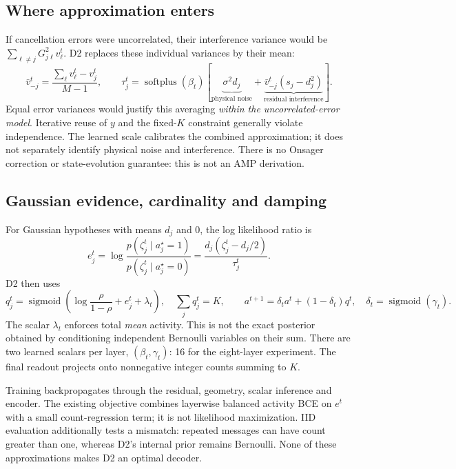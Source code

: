 \documentclass[10pt,a4paper]{article}
\newcommand{\sigm}{\operatorname{sigmoid}}
\newcommand{\softplus}{\operatorname{softplus}}
\begin{document}
\subsection{Where approximation enters}
If cancellation errors were uncorrelated, their interference variance would be
$\sum_{\ell\ne j}G_{j\ell}^2 v_\ell^t$. D2 replaces these individual variances by their mean:
\begin{equation}
 \bar v_{-j}^t=\frac{\sum_\ell v_\ell^t-v_j^t}{M-1},\qquad
 \tau_j^t=\softplus(\beta_t)
 \left[\underbrace{\sigma^2d_j}_{\text{physical noise}}+
 \underbrace{\bar v_{-j}^t(s_j-d_j^2)}_{\text{residual interference}}\right].
 \label{eq:tau}
\end{equation}
Equal error variances would justify this averaging \emph{within the uncorrelated-error model}. Iterative reuse of $y$
and the fixed-$K$ constraint generally violate independence. The learned scale calibrates the combined approximation;
it does not separately identify physical noise and interference. There is no Onsager correction or state-evolution
guarantee: this is not an AMP derivation.

\subsection{Gaussian evidence, cardinality and damping}
For Gaussian hypotheses with means $d_j$ and $0$, the log likelihood ratio is
\begin{equation}
 e_j^t=\log\frac{p(\zeta_j^t\mid a_j^\star=1)}{p(\zeta_j^t\mid a_j^\star=0)}
 =\frac{d_j(\zeta_j^t-d_j/2)}{\tau_j^t}.
\end{equation}
D2 then uses
\begin{equation}
 q_j^t=\sigm\!\left(\log\frac{\rho}{1-\rho}+e_j^t+\lambda_t\right),\quad
 \sum_j q_j^t=K,\qquad
 a^{t+1}=\delta_t a^t+(1-\delta_t)q^t,
 \quad\delta_t=\sigm(\gamma_t).
\end{equation}
The scalar $\lambda_t$ enforces total \emph{mean} activity. This is not the exact posterior obtained by conditioning
independent Bernoulli variables on their sum. There are two learned scalars per layer, $(\beta_t,\gamma_t)$: 16 for
the eight-layer experiment. The final readout projects onto nonnegative integer counts summing to $K$.

Training backpropagates through the residual, geometry, scalar inference and encoder. The existing objective combines
layerwise balanced activity BCE on $e^t$ with a small count-regression term; it is not likelihood maximization.
IID evaluation additionally tests a mismatch: repeated messages can have count greater than one, whereas D2's
internal prior remains Bernoulli. None of these approximations makes D2 an optimal decoder.
\end{document}
